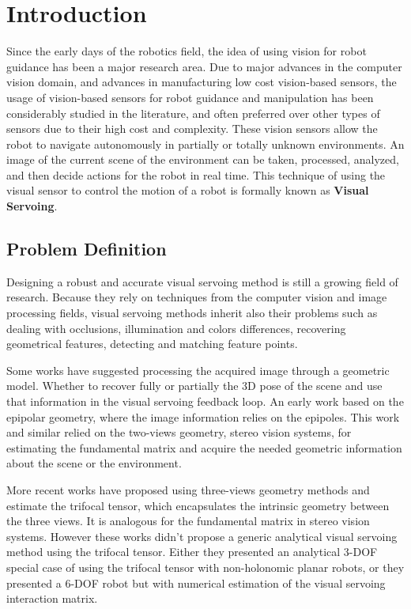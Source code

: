 \chapter{Introduction} \label{chap:intro}
Since the early days of the robotics field, the idea of using vision for robot guidance has been a major research area. Due to major advances in the computer vision domain, and advances in manufacturing low cost vision-based sensors, the usage of vision-based sensors for robot guidance and manipulation has been considerably studied in the literature, and often preferred over other types of sensors due to their high cost and complexity. These vision sensors allow the robot to navigate autonomously in partially or totally unknown environments. An image of the current scene of the environment can be taken, processed, analyzed, and then decide actions for the robot in real time. This technique of using the visual sensor to control the motion of a robot is formally known as \textbf{Visual Servoing}.

\section{Problem Definition} \label{sec:problemdefinition}
Designing a robust and accurate visual servoing method is still a growing field of research. Because they rely on techniques from the computer vision and image processing fields, visual servoing methods inherit also their problems such as dealing with occlusions, illumination and colors differences, recovering geometrical features, detecting and matching feature points.

Some works have suggested processing the acquired image through a geometric model. Whether to recover fully or partially the 3D pose of the scene and use that information in the visual servoing feedback loop. An early work based on the epipolar geometry, where the image information relies on the epipoles. This work and similar relied on the two-views geometry, stereo vision systems, for estimating the fundamental matrix and acquire the needed geometric information about the scene or the environment.

More recent works have proposed using three-views geometry methods and estimate the trifocal tensor, which encapsulates the intrinsic geometry between the three views. It is analogous for the fundamental matrix in stereo vision systems. However these works didn't propose a generic analytical visual servoing method using the trifocal tensor. Either they presented an analytical 3-DOF special case of using the trifocal tensor with non-holonomic planar robots, or they presented a 6-DOF robot but with numerical estimation of the visual servoing interaction matrix.

